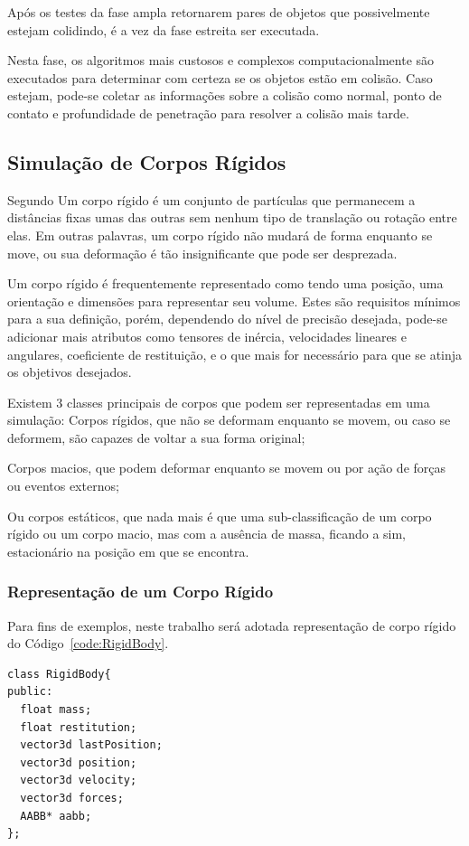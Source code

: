 Após  os testes da fase ampla retornarem pares de objetos que possivelmente
estejam colidindo, é a vez da fase estreita ser executada.

Nesta fase, os algoritmos mais custosos e complexos computacionalmente são
executados para determinar com certeza se os objetos estão em colisão.
Caso estejam, pode-se coletar as informações sobre a colisão como normal, ponto
de contato e profundidade de penetração para resolver a colisão mais tarde.


\subsection{Simulação de Corpos Rígidos}
Segundo  Um corpo rígido é um conjunto de partículas  que permanecem a distâncias fixas umas das outras  sem nenhum tipo de translação ou rotação entre elas. Em outras palavras,  um corpo rígido não mudará de forma enquanto se move, ou sua deformação é tão insignificante que pode ser desprezada.

Um corpo rígido é  frequentemente representado como tendo uma posição, uma orientação  e  dimensões para representar seu volume. Estes são requisitos mínimos para a  sua definição, porém, dependendo do nível de precisão desejada, pode-se adicionar mais atributos como tensores de inércia, velocidades lineares e angulares, coeficiente de restituição, e o que mais for necessário para que se atinja os objetivos desejados.

Existem 3 classes principais de corpos que podem ser representadas em uma simulação:
Corpos rígidos, que não se deformam  enquanto se movem, ou caso se deformem, são capazes de voltar a sua forma original;


Corpos macios, que podem deformar enquanto se movem ou por ação de forças ou eventos externos;

Ou corpos estáticos, que nada mais é que uma sub-classificação de um corpo rígido ou um corpo macio,  mas com a ausência de massa, ficando a sim, estacionário na posição em que se
encontra.

\subsubsection{Representação de um Corpo Rígido}

Para fins de exemplos, neste trabalho será adotada representação de corpo rígido do Código~\ref{code:RigidBody}.

\begin{lstlisting}[frame=single,caption=Exemplo de corpo rígido\label{code:RigidBody}]
class RigidBody{
public:
  float mass;
  float restitution;
  vector3d lastPosition;
  vector3d position;
  vector3d velocity;
  vector3d forces;
  AABB* aabb;
};
\end{lstlisting}

